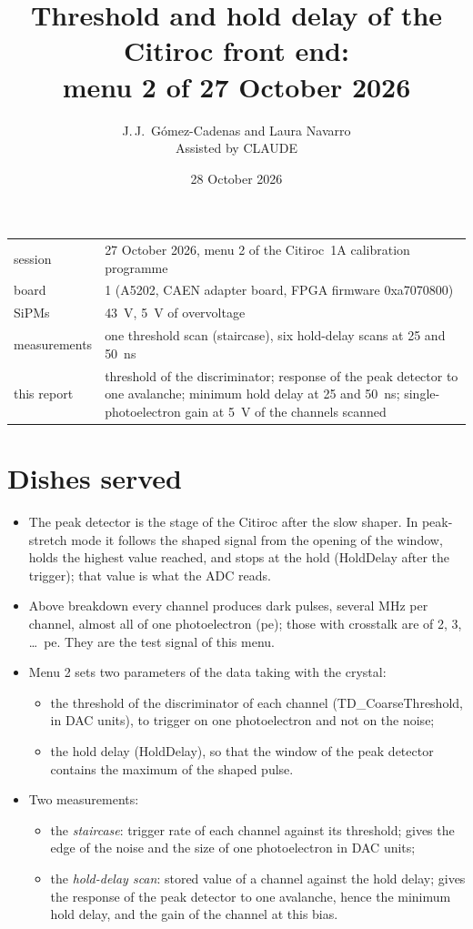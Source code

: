 \documentclass[11pt,a4paper]{article}
\title{Threshold and hold delay of the Citiroc front end:\\ menu 2 of 27 October 2026}
\author{J.\,J.~Gómez-Cadenas and Laura Navarro\\ \small Assisted by CLAUDE}
\date{28 October 2026}
\begin{document}
\maketitle

\begin{center}
\small
\begin{tabular}{lp{}}
\toprule
session & 27 October 2026, menu 2 of the Citiroc~1A calibration programme \\
board & 1 (A5202, CAEN adapter board, FPGA firmware 0xa7070800) \\
SiPMs & 43~V, 5~V of overvoltage \\
measurements & one threshold scan (staircase), six hold-delay scans at 25 and 50~ns \\
this report & threshold of the discriminator; response of the peak detector to one
  avalanche; minimum hold delay at 25 and 50~ns; single-photoelectron gain at 5~V of the
  channels scanned \\
\bottomrule
\end{tabular}
\end{center}

\section{Dishes served}

\begin{itemize}
\item The peak detector is the stage of the Citiroc after the slow shaper. In peak-stretch
  mode it follows the shaped signal from the opening of the window, holds the highest value
  reached, and stops at the hold (HoldDelay after the trigger); that value is what the ADC
  reads.
\item Above breakdown every channel produces dark pulses, several MHz per channel, almost all
  of one photoelectron (pe); those with crosstalk are of 2, 3, \ldots~pe. They are the test
  signal of this menu.
\item Menu 2 sets two parameters of the data taking with the crystal:
  \begin{itemize}
  \item the threshold of the discriminator of each channel (TD\_CoarseThreshold, in DAC
    units), to trigger on one photoelectron and not on the noise;
  \item the hold delay (HoldDelay), so that the window of the peak detector contains the
    maximum of the shaped pulse.
  \end{itemize}
\item Two measurements:
  \begin{itemize}
  \item the \emph{staircase}: trigger rate of each channel against its threshold; gives the
    edge of the noise and the size of one photoelectron in DAC units;
  \item the \emph{hold-delay scan}: stored value of a channel against the hold delay; gives
    the response of the peak detector to one avalanche, hence the minimum hold delay, and the
    gain of the channel at this bias.
  \end{itemize}
\end{itemize}
\end{document}
